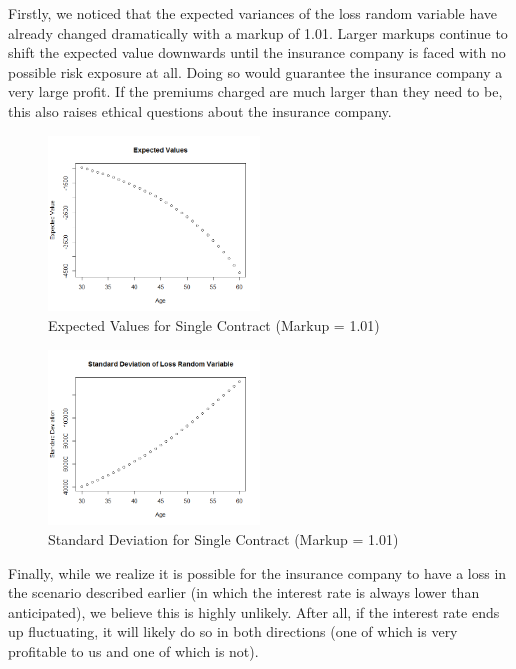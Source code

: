 \documentclass[12pt]{article}
\begin{document}
Firstly, we noticed that the expected variances of the loss random variable have already changed dramatically with a markup of 1.01. Larger markups continue to shift the expected value downwards until the insurance company is faced with no possible risk exposure at all. Doing so would guarantee the insurance company a very large profit. If the premiums charged are much larger than they need to be, this also raises ethical questions about the insurance company. 

\begin{figure}[!ht]
\centering
\includegraphics[width=0.5\textwidth]{images/expectedValuesMarkup}
\caption{Expected Values for Single Contract (Markup = 1.01)}
\label{figure:lossFunctionMarkup}
\end{figure}

\begin{figure}[!ht]
\begin{center}
\includegraphics[width=0.5\textwidth]{images/stdevValuesMarkup}
\caption{Standard Deviation for Single Contract (Markup = 1.01)}
\end{center}
\end{figure}

Finally, while we realize it is possible for the insurance company to have a loss in the scenario described earlier (in which the interest rate is always lower than anticipated), we believe this is highly unlikely. After all, if the interest rate ends up fluctuating, it will likely do so in both directions (one of which is very profitable to us and one of which is not). 
\end{document}
